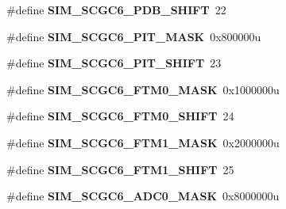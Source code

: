 \begin{DoxyCompactItemize}
\item 
\hypertarget{group___s_i_m___register___masks_ga7b7b645afc3ee38683f7e4d9d300e653}{}\#define {\bfseries S\+I\+M\+\_\+\+S\+C\+G\+C6\+\_\+\+P\+D\+B\+\_\+\+S\+H\+I\+F\+T}~22\label{group___s_i_m___register___masks_ga7b7b645afc3ee38683f7e4d9d300e653}

\item 
\hypertarget{group___s_i_m___register___masks_gaf5baabd241aba695593ce6369aa56ee2}{}\#define {\bfseries S\+I\+M\+\_\+\+S\+C\+G\+C6\+\_\+\+P\+I\+T\+\_\+\+M\+A\+S\+K}~0x800000u\label{group___s_i_m___register___masks_gaf5baabd241aba695593ce6369aa56ee2}

\item 
\hypertarget{group___s_i_m___register___masks_ga2600ceb860eb353aa61abbecdbf5b6ae}{}\#define {\bfseries S\+I\+M\+\_\+\+S\+C\+G\+C6\+\_\+\+P\+I\+T\+\_\+\+S\+H\+I\+F\+T}~23\label{group___s_i_m___register___masks_ga2600ceb860eb353aa61abbecdbf5b6ae}

\item 
\hypertarget{group___s_i_m___register___masks_ga391c6879fab4bb2359b717ab898344f9}{}\#define {\bfseries S\+I\+M\+\_\+\+S\+C\+G\+C6\+\_\+\+F\+T\+M0\+\_\+\+M\+A\+S\+K}~0x1000000u\label{group___s_i_m___register___masks_ga391c6879fab4bb2359b717ab898344f9}

\item 
\hypertarget{group___s_i_m___register___masks_ga7d1645004ea28638d3370def2505aad0}{}\#define {\bfseries S\+I\+M\+\_\+\+S\+C\+G\+C6\+\_\+\+F\+T\+M0\+\_\+\+S\+H\+I\+F\+T}~24\label{group___s_i_m___register___masks_ga7d1645004ea28638d3370def2505aad0}

\item 
\hypertarget{group___s_i_m___register___masks_gacd8912282b78e6b939981ce4c313065f}{}\#define {\bfseries S\+I\+M\+\_\+\+S\+C\+G\+C6\+\_\+\+F\+T\+M1\+\_\+\+M\+A\+S\+K}~0x2000000u\label{group___s_i_m___register___masks_gacd8912282b78e6b939981ce4c313065f}

\item 
\hypertarget{group___s_i_m___register___masks_gaabc95256d64e237982e5b6d15ad53e89}{}\#define {\bfseries S\+I\+M\+\_\+\+S\+C\+G\+C6\+\_\+\+F\+T\+M1\+\_\+\+S\+H\+I\+F\+T}~25\label{group___s_i_m___register___masks_gaabc95256d64e237982e5b6d15ad53e89}

\item 
\hypertarget{group___s_i_m___register___masks_ga481c725e02da6a245c9d715307969f09}{}\#define {\bfseries S\+I\+M\+\_\+\+S\+C\+G\+C6\+\_\+\+A\+D\+C0\+\_\+\+M\+A\+S\+K}~0x8000000u\label{group___s_i_m___register___masks_ga481c725e02da6a245c9d715307969f09}


\end{DoxyCompactItemize}

